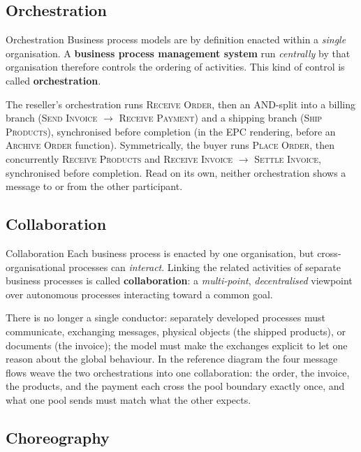 \subsection{Orchestration}

\begin{definitionbox}{Orchestration}
Business process models are by definition enacted within a \emph{single} organisation. A \textbf{business process management system} run \emph{centrally} by that organisation therefore controls the ordering of activities. This kind of control is called \textbf{orchestration}.
\end{definitionbox}

The reseller's orchestration runs \textsc{Receive Order}, then an AND-split into a billing branch (\textsc{Send Invoice} $\to$ \textsc{Receive Payment}) and a shipping branch (\textsc{Ship Products}), synchronised before completion (in the EPC rendering, before an \textsc{Archive Order} function). Symmetrically, the buyer runs \textsc{Place Order}, then concurrently \textsc{Receive Products} and \textsc{Receive Invoice} $\to$ \textsc{Settle Invoice}, synchronised before completion. Read on its own, neither orchestration shows a message to or from the other participant.

\subsection{Collaboration}

\begin{definitionbox}{Collaboration}
Each business process is enacted by one organisation, but cross-organisational processes can \emph{interact}. Linking the related activities of separate business processes is called \textbf{collaboration}: a \emph{multi-point}, \emph{decentralised} viewpoint over autonomous processes interacting toward a common goal.
\end{definitionbox}

There is no longer a single conductor: separately developed processes must communicate, exchanging messages, physical objects (the shipped products), or documents (the invoice); the model must make the exchanges explicit to let one reason about the global behaviour. In the reference diagram the four message flows weave the two orchestrations into one collaboration: the order, the invoice, the products, and the payment each cross the pool boundary exactly once, and what one pool sends must match what the other expects.

\subsection{Choreography}

